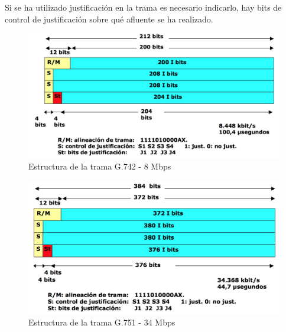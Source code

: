 \documentclass[10pt,portrait, twocolumn]{article}
\makeatletter
\renewcommand{\subsubsection}{\@startsection{subsubsection}{3}{0mm}%
                                {-1ex plus -.5ex minus -.2ex}%
                                {1ex plus .2ex}%
                                {\normalfont\small\bfseries}}
\makeatother
\begin{document}
Si se ha utilizado justificación en la trama es necesario indicarlo, hay bits de control de justificación sobre qué afluente se ha realizado.

	

	\begin{figure}[!ht]
 		\centering
  		 \includegraphics[scale = 0.3]{images/TramaG742}
		\caption{Estructura de la trama G.742 - 8 Mbps}
	\end{figure}
	

	
	\begin{figure}[!ht]
 		\centering
  		 \includegraphics[scale = 0.3]{images/TramaG751}
		\caption{Estructura de la trama G.751 - 34 Mbps}
	\end{figure}
	
\end{document}
